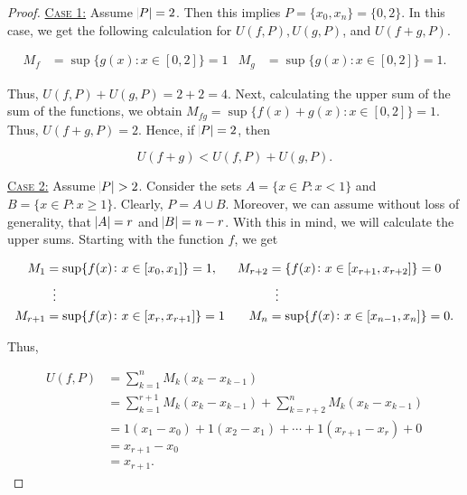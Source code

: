 \documentclass{article}
\theoremstyle{definition}
\theoremstyle{remark}
\theoremstyle{definition}
\begin{document}
\begin{enumerate}[leftmargin=*]
\begin{proof}
    \vspace{4mm}
    
    \noindent\underline{\textsc{Case 1:}} Assume $\abs{P}=2$. Then this implies $P=\{x_0,x_n\}=\{0,2\}$. In this case, we get the following calculation for $U(f,P),U(g,P)$, and $U(f+g,P)$. 
    
    \begin{align*}
        M_f&=\sup\{g(x)\colon x\in[0,2]\}=1 & M_g&=\sup\{g(x)\colon x\in[0,2]\}=1.
    \end{align*}
    
    \noindent Thus, $U(f,P)+U(g,P)=2+2=4$. Next, calculating the upper sum of the sum of the functions, we obtain $M_{fg}=\sup\{f(x)+g(x)\colon x\in[0,2]\}=1$. Thus, $U(f+g,P)=2$. Hence, if $\abs{P}=2$, then 
    
    \begin{equation*}
        U(f+g)<U(f,P)+U(g,P).
    \end{equation*}
    
    \noindent\underline{\textsc{Case 2:}} Assume $\abs{P}>2$. Consider the sets $A=\{x\in P\colon x<1\}$ and $B=\{x\in P\colon x\geq 1\}$. Clearly, $P=A\cup B$. Moreover, we can assume without loss of generality, that $\abs{A}=r$ and $\abs{B}=n-r$. With this in mind, we will calculate the upper sums. Starting with the function $f$, we get
    
    \newpage
    
    \begin{align*}
        M_1&=\sup\{f(x)\colon x\in[x_0,x_1]\}=1, & M_{r+2}&=\{f(x)\colon x\in[x_{r+1},x_{r+2}]\} = 0 \\ 
        &\hspace{2mm}\vdots & &\hspace{2mm}\vdots \\
        M_{r+1}&=\sup\{f(x)\colon x\in[x_r,x_{r+1}]\}=1 & M_n&=\sup\{f(x)\colon x\in[x_{n-1},x_n]\}=0.
    \end{align*}
    
    \noindent Thus,
    
    \begin{equation*}
        \begin{split}
            U(f,P)&=\sum_{k=1}^n M_k(x_k-x_{k-1}) \\
            &=\sum_{k=1}^{r+1}M_k(x_k-x_{k-1})+\sum_{k=r+2}^n M_k(x_k-x_{k-1}) \\
            &=1(x_1-x_0)+1(x_2-x_1)+\cdots+1(x_{r+1}-x_r)+0 \\
            &= x_{r+1}-x_0 \\
            &=x_{r+1}.
        \end{split}
    \end{equation*}
    

\end{proof}
\end{enumerate}
\end{document}

